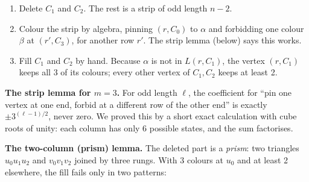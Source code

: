 \documentclass[11pt,oneside,openany]{book}
\begin{document}
\begin{enumerate}[itemsep=0.3em]
\item Delete $C_1$ and $C_2$. The rest is a strip of odd length $n-2$.
\item Colour the strip by algebra, \textcolor{pinc}{pinning} $(r, C_0)$ to $\alpha$ and
\textcolor{forbc}{forbidding} one colour $\beta$ at $(r', C_3)$, for another row $r'$. The strip
lemma (below) says this works.
\item Fill $C_1$ and $C_2$ by hand. Because $\alpha$ is not in $L(r,C_1)$, the vertex
$(r, C_1)$ keeps all 3 of its colours; every other vertex of $C_1, C_2$ keeps at least 2.
\end{enumerate}

\textbf{The strip lemma for $m=3$.} For odd length $\ell$, the coefficient for ``pin one vertex
at one end, forbid at a different row of the other end'' is exactly $\pm 3^{(\ell-1)/2}$, never
zero. We proved this by a short exact calculation with cube roots of unity: each column has only
6 possible states, and the sum factorises.

\textbf{The two-column (prism) lemma.} The deleted part is a \emph{prism}: two triangles
$u_0u_1u_2$ and $v_0v_1v_2$ joined by three rungs. With 3 colours at $u_0$ and at least 2
elsewhere, the fill fails only in two patterns:

\begin{center}
\end{center}
\end{document}
